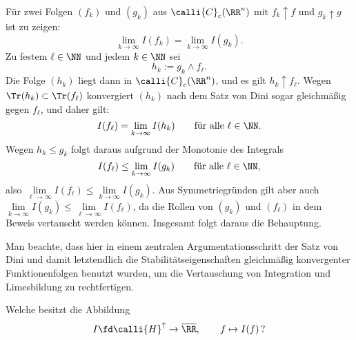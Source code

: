 \begin{antwort}
  F\"ur zwei Folgen $(f_k)$ und $(g_k)$ aus $\calli{C}_c(\RR^n)$ 
  mit $f_k \uparrow f$ und $g_k \uparrow g$ ist zu zeigen:
  \[
  \lim_{k\to\infty} I(f_k) = \lim_{k\to\infty} I(g_k).
  \]
  Zu festem $\ell\in\NN$ und jedem $k\in\NN$ sei
  \[
  h_k := g_k \wedge f_\ell. 
  \]
  Die Folge $(h_k)$ liegt dann in $\calli{C}_c (\RR^n)$, und es gilt 
  $h_k \!\uparrow \! f_\ell$. Wegen $\Tr( h_k) \subset \Tr( f_\ell )$ 
  konvergiert $(h_k)$ nach dem Satz von Dini   
  sogar gleichm\"a{\ss}ig gegen $f_\ell$, und daher gilt:  
  \[
  I (f_\ell) = \lim_{k\to\infty} I(h_k) \qquad\text{f\"ur alle $\ell\in\NN$}.
  \]
  Wegen $h_k \le g_k$ folgt daraus aufgrund der Monotonie des Integrals 
  \[
  I(f_\ell) \le \lim_{k\to\infty} I(g_k) 
  \qquad\text{f\"ur alle $\ell\in\NN$}, 
  \]
  also $\lim\limits_{\ell\to\infty} I(f_\ell) \le
  \lim\limits_{k\to\infty}  I(g_k)$. Aus Symmetriegründen gilt aber 
  auch $\lim\limits_{k\to\infty} I(g_k) \le 
  \lim\limits_{\ell\to\infty} I(f_\ell)$,  
  da die Rollen von $(g_k)$ und $(f_\ell)$ 
  in dem Beweis vertauscht werden können. 
  Insgesamt folgt daraus die Behauptung. 

  Man beachte, dass hier in einem zentralen Argumentationsschritt der 
  Satz von Dini und damit letztendlich die Stabilitätseigenschaften 
  gleichmäßig konvergenter Funktionenfolgen benutzt wurden, 
  um die Vertauschung von Integration und Limesbildung zu rechtfertigen. 
  \AntEnd
\end{antwort}

\begin{frage}
  Welche  besitzt die Abbildung 
  \[
  I \fd \calli{H}^{\uparrow} \to \overline{\RR},\qquad 
  f \mapsto I(f)\, \text{?}
  \]
\end{frage}

